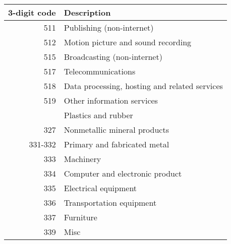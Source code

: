 \begin{table}[]
	\centering
	\label{}
	\begin{tabular}{rl}
		\toprule \toprule
		3-digit code & Description \tabularnewline
		\midrule
		511 & Publishing (non-internet) \tabularnewline 
		512 & Motion picture and sound recording \tabularnewline 
		515 & Broadcasting (non-internet) \tabularnewline
		517 & Telecommunications \tabularnewline  
		518 & Data processing, hosting and related services \tabularnewline
		519 & Other information services \tabularnewline
		& Plastics and rubber \tabularnewline
		327 & Nonmetallic mineral products \tabularnewline 
		331-332 & Primary and fabricated metal  \tabularnewline
		333 & Machinery \tabularnewline
		334 & Computer and electronic product \tabularnewline
		335 & Electrical equipment \tabularnewline
		336 & Transportation equipment \tabularnewline
		337 & Furniture \tabularnewline
		339 & Misc \tabularnewline
		\bottomrule
	\end{tabular}
\end{table}